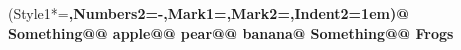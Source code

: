 \documentclass[preview]{standalone}
\begin{document}
\begin{center}
\begin{easylist}\ListProperties(Style1*=\bfseries,Numbers2=-,Mark1={},Mark2={},Indent2=1em)@ Something@@ apple@@ pear@@ banana@ Something@@ Frogs\end{easylist}
\end{center}
\end{document}
